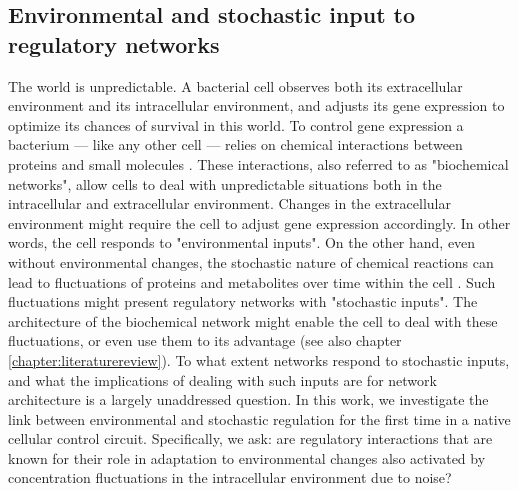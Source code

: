 \subsection{Environmental and stochastic input to regulatory networks}

The world is unpredictable.
%
A bacterial cell observes both its extracellular environment and its intracellular environment,
and adjusts its gene expression to 
optimize its chances of survival in this world.
%
To control gene expression a bacterium --- like any other cell --- relies on chemical interactions between proteins and small molecules \cite{Bray1995, Alon2006, Alon2007, Tyson2010}.
These interactions, also referred to as "biochemical networks", 
%
allow cells to deal with 
unpredictable situations
both in the intracellular and extracellular environment.
%
Changes in the extracellular environment might require the cell to adjust gene expression accordingly.
In other words, the cell responds to "environmental inputs".
%
On the other hand,  even without environmental changes, the stochastic nature of chemical reactions can lead to fluctuations of proteins and metabolites over time within the cell \cite{Elowitz2002,Kiviet2014}.
Such fluctuations might present regulatory networks with "stochastic inputs".
The architecture of the biochemical network might enable the cell to deal with these fluctuations, or even use them to its advantage (see also chapter \ref{chapter:literaturereview}).
%
To what extent networks respond to stochastic inputs, 
and what the implications of dealing with such inputs are for network architecture
is a largely unaddressed question.
%
In this work, we investigate the link between environmental and stochastic regulation for the first time in a native cellular control circuit. %
%
Specifically, we ask:
are regulatory interactions that are known for their role in adaptation to environmental changes also 
activated 
by concentration fluctuations in the intracellular environment due to noise?





